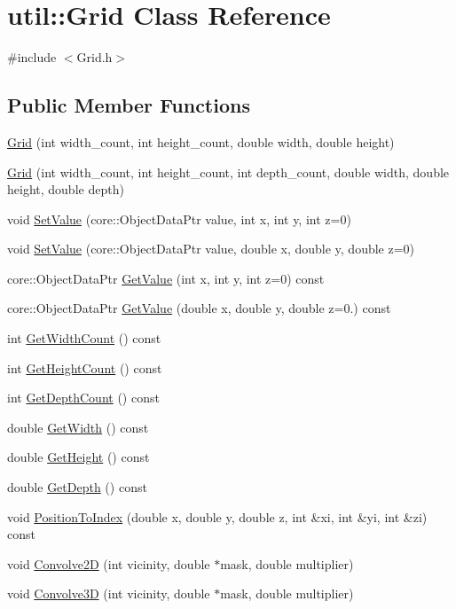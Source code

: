 \hypertarget{classutil_1_1Grid}{}\section{util\+:\+:Grid Class Reference}
\label{classutil_1_1Grid}


{\ttfamily \#include $<$Grid.\+h$>$}

\subsection*{Public Member Functions}
\begin{DoxyCompactItemize}
\item 
\hyperlink{classutil_1_1Grid_a0b2bfd0044eb5633a3f1121e5e70709e}{Grid} (int width\+\_\+count, int height\+\_\+count, double width, double height)
\item 
\hyperlink{classutil_1_1Grid_ad6457dda588e20ccd503e363e96dd57e}{Grid} (int width\+\_\+count, int height\+\_\+count, int depth\+\_\+count, double width, double height, double depth)
\item 
void \hyperlink{classutil_1_1Grid_a0e93bd63922e7cbe405176a1ae21877e}{Set\+Value} (core\+::\+Object\+Data\+Ptr value, int x, int y, int z=0)
\item 
void \hyperlink{classutil_1_1Grid_ad7dbf79146d9f5ae1662910b82fd25ea}{Set\+Value} (core\+::\+Object\+Data\+Ptr value, double x, double y, double z=0)
\item 
core\+::\+Object\+Data\+Ptr \hyperlink{classutil_1_1Grid_a6658334ae9b505c56b75f6f15434832e}{Get\+Value} (int x, int y, int z=0) const
\item 
core\+::\+Object\+Data\+Ptr \hyperlink{classutil_1_1Grid_a6cc6449dfe16dde11035fe2d16a321cd}{Get\+Value} (double x, double y, double z=0.) const
\item 
int \hyperlink{classutil_1_1Grid_a3f5cdd325b3e3eb30ca5d38bd31d005e}{Get\+Width\+Count} () const
\item 
int \hyperlink{classutil_1_1Grid_a0c63eb86e4be8c63e996ff61c3ef8b7f}{Get\+Height\+Count} () const
\item 
int \hyperlink{classutil_1_1Grid_a04f1c2fe745d469e49cf2523fe0f34fd}{Get\+Depth\+Count} () const
\item 
double \hyperlink{classutil_1_1Grid_a8b4dc63bee5859cae315969e039b4cac}{Get\+Width} () const
\item 
double \hyperlink{classutil_1_1Grid_a2d02a1eafe76faaa7e0f63ce406d782f}{Get\+Height} () const
\item 
double \hyperlink{classutil_1_1Grid_afe6698a6766a43082ceea2d4bf27619e}{Get\+Depth} () const
\item 
void \hyperlink{classutil_1_1Grid_a775e2a7574c81dd7acd1d185b2e72ed5}{Position\+To\+Index} (double x, double y, double z, int \&xi, int \&yi, int \&zi) const
\item 
void \hyperlink{classutil_1_1Grid_a6597c4f785a764c0b291b8135863fe67}{Convolve2D} (int vicinity, double $\ast$mask, double multiplier)
\item 
void \hyperlink{classutil_1_1Grid_ac161adb14df09651a6b33f855d887bfa}{Convolve3D} (int vicinity, double $\ast$mask, double multiplier)
\end{DoxyCompactItemize}


